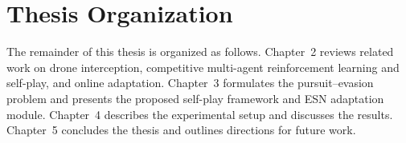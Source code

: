 \section{Thesis Organization}
\noindent
The remainder of this thesis is organized as follows. Chapter~2 reviews related work on drone interception, competitive multi-agent reinforcement learning and self-play, and online adaptation. Chapter~3 formulates the pursuit--evasion problem and presents the proposed self-play framework and ESN adaptation module. Chapter~4 describes the experimental setup and discusses the results. Chapter~5 concludes the thesis and outlines directions for future work.
